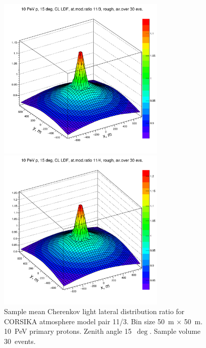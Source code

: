 \documentclass[final,5p,times,twocolumn]{elsarticle}
\begin{document}
\begin{figure}[tb]
 \begin{minipage}[t]{0.48\textwidth}
    \centering
    \includegraphics[width=19pc]{11d3}%
    \vspace{-1.0pc}
    \caption{Sample mean Cherenkov light lateral distribution ratio for CORSIKA atmosphere model
    pair 11/3. Bin size 50~m $\times$ 50~m. 10~PeV primary protons. Zenith angle 15~$\deg$. Sample volume 30~events.}
\label{fig:3d11}
\end{minipage}
\hfill
\begin{minipage}[t]{0.48\textwidth}
    \centering
    \includegraphics[width=19pc]{11d4}%

\end{minipage}
\end{figure}
\end{document}
